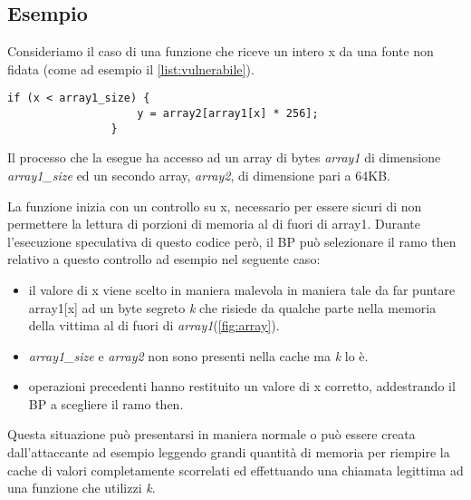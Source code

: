 		\subsection{Esempio}
		
			Consideriamo il caso di una funzione che riceve un intero x da una fonte non fidata (come ad esempio il \cref{list:vulnerabile}).
			
			\begin{lstlisting}[caption={Funzione vulnerabile},label={list:vulnerabile}]
				if (x < array1_size) {
					y = array2[array1[x] * 256];
				}
			\end{lstlisting}
			
			Il processo che la esegue ha accesso ad un array di bytes \emph{array1} di dimensione \emph{array1\_size} ed un secondo array, \emph{array2}, di dimensione pari a 64KB.
			
			La funzione inizia con un controllo su x, necessario per essere sicuri di non permettere la lettura di porzioni di memoria al di fuori di array1. Durante l'esecuzione speculativa di questo codice però, il \ac{BP} può selezionare il ramo then relativo a questo controllo ad esempio nel seguente caso:
			
			\begin{itemize}
				\item il valore di x viene scelto in maniera malevola in maniera tale da far puntare array1[x] ad un byte segreto \emph{k} che risiede da qualche parte nella memoria della vittima al di fuori di \emph{array1}(\cref{fig:array}).
				\item \emph{array1\_size} e \emph{array2} non sono presenti nella cache ma \emph{k} lo è.
				\item operazioni precedenti hanno restituito un valore di x corretto, addestrando il \ac{BP} a scegliere il ramo then.
			\end{itemize}
		
			Questa situazione può presentarsi in maniera normale o può essere creata dall'attaccante ad esempio leggendo grandi quantità di memoria per riempire la cache di valori completamente scorrelati ed effettuando una chiamata legittima ad una funzione che utilizzi \emph{k}.
			
